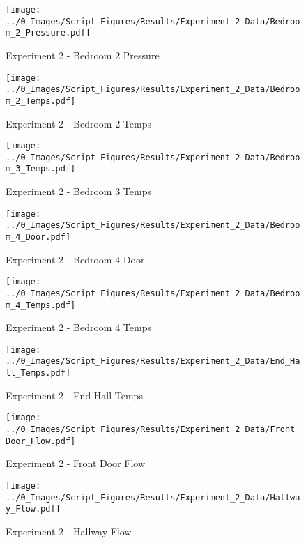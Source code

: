 	\begin{figure}[H]
		\centering
		\texttt{[image: ../0\_Images/Script\_Figures/Results/Experiment\_2\_Data/Bedroom\_2\_Pressure.pdf]}
		\caption[]{Experiment 2 - Bedroom 2 Pressure}
	\end{figure}
 
	\clearpage

	\begin{figure}[H]
		\centering
		\texttt{[image: ../0\_Images/Script\_Figures/Results/Experiment\_2\_Data/Bedroom\_2\_Temps.pdf]}
		\caption[]{Experiment 2 - Bedroom 2 Temps}
	\end{figure}
 

	\begin{figure}[H]
		\centering
		\texttt{[image: ../0\_Images/Script\_Figures/Results/Experiment\_2\_Data/Bedroom\_3\_Temps.pdf]}
		\caption[]{Experiment 2 - Bedroom 3 Temps}
	\end{figure}
 
	\clearpage

	\begin{figure}[H]
		\centering
		\texttt{[image: ../0\_Images/Script\_Figures/Results/Experiment\_2\_Data/Bedroom\_4\_Door.pdf]}
		\caption[]{Experiment 2 - Bedroom 4 Door}
	\end{figure}
 

	\begin{figure}[H]
		\centering
		\texttt{[image: ../0\_Images/Script\_Figures/Results/Experiment\_2\_Data/Bedroom\_4\_Temps.pdf]}
		\caption[]{Experiment 2 - Bedroom 4 Temps}
	\end{figure}
 
	\clearpage

	\begin{figure}[H]
		\centering
		\texttt{[image: ../0\_Images/Script\_Figures/Results/Experiment\_2\_Data/End\_Hall\_Temps.pdf]}
		\caption[]{Experiment 2 - End Hall Temps}
	\end{figure}
 

	\begin{figure}[H]
		\centering
		\texttt{[image: ../0\_Images/Script\_Figures/Results/Experiment\_2\_Data/Front\_Door\_Flow.pdf]}
		\caption[]{Experiment 2 - Front Door Flow}
	\end{figure}
 
	\clearpage

	\begin{figure}[H]
		\centering
		\texttt{[image: ../0\_Images/Script\_Figures/Results/Experiment\_2\_Data/Hallway\_Flow.pdf]}
		\caption[]{Experiment 2 - Hallway Flow}
	\end{figure}
 

